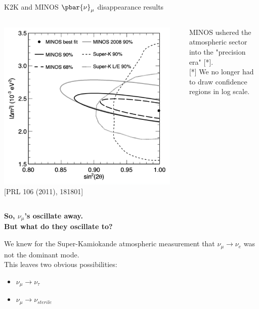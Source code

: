 \begin{frame}[t]{K2K and MINOS $\pbar{\nu}_{\mu}$ disappearance results}

  \begin{columns}
    \begin{column}{0.60\textwidth}
      {\centering
        \includegraphics[width=0.95\textwidth]{./images/3nu/accelerator/minos_disapp_cont_2011.png}\\
        {\scriptsize \color{blue}[PRL 106 (2011), 181801]}\\
      }
    \end{column}
    \begin{column}{0.40\textwidth}
      MINOS ushered the atmospheric sector into the "precision era" [*].\\
      \vspace{2.5cm}
      {\small
        [*] We no longer had to draw confidence regions in log scale.
      }
    \end{column}
  \end{columns}

\end{frame}


\begin{frame}[plain,c]
 \begin{center}
 {\Large
  {\bf So, $\nu_{\mu}$'s oscillate away.\\ But what do they oscillate to?\\}
 }
 \end{center}
 \vspace{0.3cm}
 We knew for the Super-Kamiokande atmospheric measurement that
 $\nu_{\mu} \rightarrow \nu_{e}$ was not the dominant mode.\\
 \vspace{0.3cm}
 This leaves two obvious possibilities:
 \begin{itemize}
         \item $\nu_{\mu} \rightarrow \nu_{\tau}$
         \item $\nu_{\mu} \rightarrow \nu_{sterile}$
 \end{itemize}
\end{frame}


